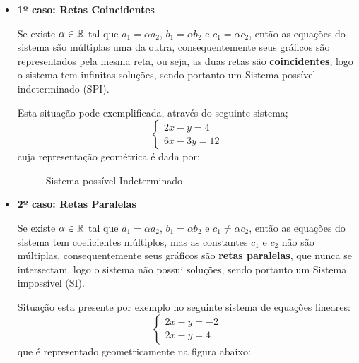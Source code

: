  \begin{itemize}
  \item \textbf{1º caso: Retas Coincidentes}


 Se existe $\alpha \in \mathbb{R}$ tal que $a_1= \alpha a_2$, $b_1= \alpha b_2$ e $c_1= \alpha c_2$, então as equações do sistema são múltiplas uma da outra, consequentemente seus gráficos são representados pela mesma reta, ou seja, as duas retas são \textbf{coincidentes}, logo o sistema tem infinitas soluções, sendo portanto um {\color{red} Sistema possível indeterminado (SPI)}.

 \begin{exem}
 Esta situação pode exemplificada, através do seguinte sistema;
 \[\begin{cases}
    2x - y= 4 \\
    6x - 3y= 12
   \end{cases}
\]
cuja representação geométrica é dada por:

 \begin{figure}[H]
 \centering
    \caption{Sistema possível Indeterminado}
  \end{figure}
 \end{exem}

 \item \textbf{2º caso: Retas Paralelas}

 Se existe $\alpha \in \mathbb{R}$ tal que $a_1= \alpha a_2$, $b_1= \alpha b_2$ e $c_1 \neq \alpha c_2$, então as equações do sistema tem coeficientes múltiplos, mas as constantes $c_1$ e $c_2$ não são múltiplas, consequentemente seus gráficos são \textbf{retas paralelas}, que nunca se intersectam, logo o sistema não possui soluções, sendo portanto um {\color{red} Sistema impossível (SI)}.

\begin{exem}
 Situação esta presente por exemplo no seguinte sistema de equações lineares:
 \[\begin{cases}
    2x - y= -2 \\
    2x - y= 4
   \end{cases}
\]
que é representado geometricamente na figura abaixo:


\end{exem}
\end{itemize}

